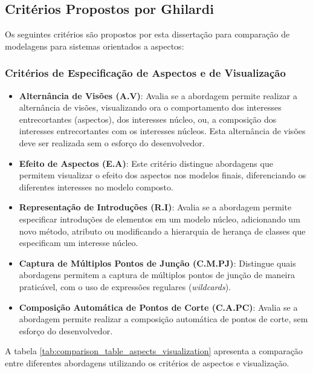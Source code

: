 \subsection{Critérios Propostos por Ghilardi}

Os seguintes critérios são propostos por esta dissertação para comparação de modelagens para sistemas orientados a aspectos:

\subsubsection{Critérios de Especificação de Aspectos e de Visualização}

\begin{itemize}
	\item \textbf{Alternância de Visões (A.V)}: Avalia se a abordagem permite realizar a alternância de visões, visualizando ora o comportamento dos
	interesses entrecortantes (aspectos), dos interesses núcleo, ou, a composição dos interesses entrecortantes com os interesses núcleos. Esta alternância de visões deve 
	ser realizada sem o esforço do desenvolvedor.
	\item \textbf{Efeito de Aspectos (E.A)}: Este critério distingue abordagens que permitem visualizar o efeito dos aspectos nos modelos finais,
	diferenciando os diferentes interesses no modelo composto.
	\item \textbf{Representação de Introduções (R.I)}: Avalia se a abordagem permite especificar introduções de elementos em um modelo núcleo,
	adicionando um novo método, atributo ou modificando a hierarquia de herança de classes que especificam um interesse núcleo.
	\item \textbf{Captura de Múltiplos Pontos de Junção (C.M.PJ)}: Distingue quais abordagens
	permitem a captura de múltiplos pontos de junção de maneira praticável, com o uso de expressões regulares (\textit{wildcards}).
	\item \textbf{Composição Automática de Pontos de Corte (C.A.PC)}: Avalia se a abordagem permite realizar a composição automática de pontos de corte,
	sem esforço do desenvolvedor.
\end{itemize}

A tabela \ref{tab:comparison_table_aspects_visualization} apresenta a comparação entre diferentes abordagens utilizando os critérios de aspectos e
visualização.

